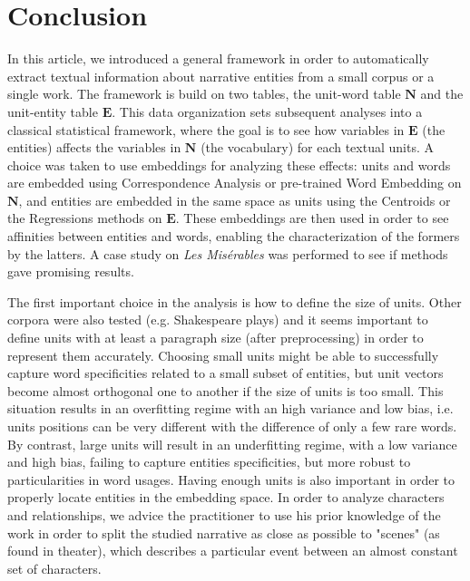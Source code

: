 \documentclass[
twocolumn,
]{ceurart}
\begin{document}
\section{Conclusion}
\label{conclusion}

In this article, we introduced a general framework in order to automatically extract textual information about narrative entities from a small corpus or a single work. The framework is build on two tables, the unit-word table $\mathbf{N}$ and the unit-entity table $\mathbf{E}$. This data organization sets subsequent analyses into a classical statistical framework, where the goal is to see how variables in $\mathbf{E}$ (the entities) affects the variables in $\mathbf{N}$ (the vocabulary) for each textual units. A choice was taken to use embeddings for analyzing these effects: units and words are embedded using Correspondence Analysis or pre-trained Word Embedding on $\mathbf{N}$, and entities are embedded in the same space as units using the Centroids or the Regressions methods on $\mathbf{E}$. These embeddings are then used in order to see affinities between entities and words, enabling the characterization of the formers by the latters. A case study on \emph{Les Misérables} was performed to see if methods gave promising results.

The first important choice in the analysis is how to define the size of units. Other corpora were also tested (e.g. Shakespeare plays) and it seems important to define units with at least a paragraph size (after preprocessing) in order to represent them accurately. Choosing small units might be able to successfully capture word specificities related to a small subset of entities, but unit vectors become almost orthogonal one to another if the size of units is too small. This situation results in an overfitting regime with an high variance and low bias, i.e. units positions can be very different with the difference of only a few rare words. By contrast, large units will result in an underfitting regime, with a low variance and high bias, failing to capture entities specificities, but more robust to particularities in word usages. Having enough units is also important in order to properly locate entities in the embedding space. In order to analyze characters and relationships, we advice the practitioner to use his prior knowledge of the work in order to split the studied narrative as close as possible to "scenes" (as found in theater), which describes a particular event between an almost constant set of characters.
\end{document}
